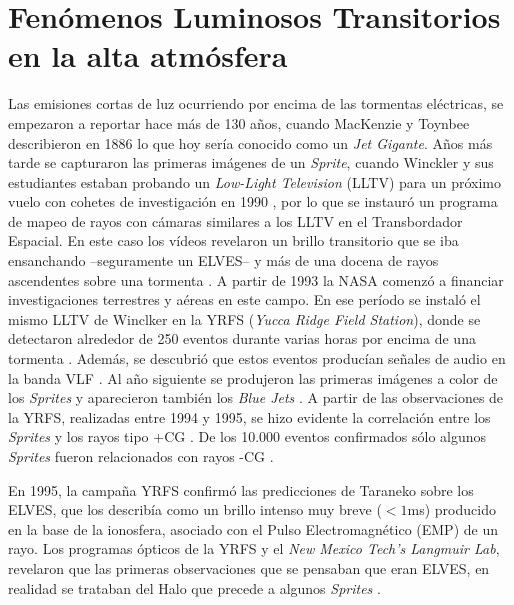 \documentclass[11pt,oneside,openany,letter]{book}
\begin{document}


\chapter{Fenómenos Luminosos Transitorios en la alta atmósfera}\label{fenomenos}
Las emisiones cortas de luz ocurriendo por encima de las tormentas eléctricas, se empezaron a reportar hace más de 130 años, cuando MacKenzie y Toynbee describieron en 1886 \cite{FullekrugEtal2006} lo que hoy sería conocido como un \textit{Jet Gigante}. Años más tarde se capturaron las primeras imágenes de un \textit{Sprite}, cuando Winckler y sus estudiantes estaban probando un \textit{Low-Light Television} (LLTV) para un próximo vuelo con cohetes de investigación en 1990 \cite{FranzEtal1990}, por lo que se instauró un programa de mapeo de rayos con cámaras similares a los LLTV en el Transbordador Espacial. En este caso los vídeos revelaron un brillo transitorio que se iba ensanchando --seguramente un ELVES-- y más de una docena de rayos ascendentes sobre una tormenta \cite{BoeckEtal1992, Lyons1994A}. A partir de 1993 la NASA comenzó a financiar investigaciones terrestres y aéreas en este campo. En ese período se instaló el mismo LLTV de Winclker en la YRFS (\textit{Yucca Ridge Field Station}), donde se detectaron alrededor de 250 eventos durante varias horas por encima de una tormenta \cite{Lyons1994A, Lyons1994B}. Adem\'as, se descubri\'o que estos eventos produc\'ian señales de audio en la banda VLF \cite{FullekrugEtal2006}. Al año siguiente se produjeron las primeras imágenes a color de los \textit{Sprites} y aparecieron tambi\'en los \textit{Blue Jets} \cite{SentmanEtal1995}. A partir de las observaciones de la YRFS, realizadas entre 1994 y 1995, se hizo evidente la correlación entre los \textit{Sprites} y los rayos tipo +CG \cite{Lyons1996B}. De los 10.000 eventos confirmados sólo algunos \textit{Sprites} fueron relacionados con rayos -CG \cite{BarringtonEtal1999}.

En 1995, la campaña YRFS confirm\'o las predicciones de Taraneko \cite{TaranenkoEtal1993} sobre los ELVES, que los describía como un brillo intenso muy breve ($<1$ms) producido en la base de la ionosfera, asociado con el Pulso Electromagnético (EMP) de un rayo. Los programas ópticos de la YRFS y el \textit{New Mexico Tech’s Langmuir Lab}, revelaron que las primeras observaciones que se pensaban que eran ELVES, en realidad se trataban del Halo que precede a algunos \textit{Sprites} \cite{FullekrugEtal2006}. 
\end{document}
